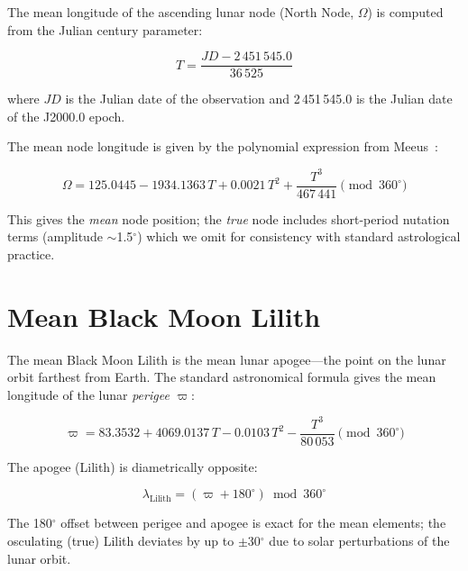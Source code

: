 \documentclass[11pt,letterpaper,twocolumn]{article}
\begin{document}
The mean longitude of the ascending lunar node (North Node, $\Omega$) is computed from the Julian century parameter:

\begin{equation}
T = \frac{JD - 2\,451\,545.0}{36\,525}
\end{equation}

where $JD$ is the Julian date of the observation and 2\,451\,545.0 is the Julian date of the J2000.0 epoch.

The mean node longitude is given by the polynomial expression from Meeus~\cite{meeus}:

\begin{equation}\label{eq:node}
\Omega = 125.0445 - 1934.1363\,T + 0.0021\,T^2 + \frac{T^3}{467\,441} \pmod{360^\circ}
\end{equation}

This gives the \textit{mean} node position; the \textit{true} node includes short-period nutation terms (amplitude $\sim$1.5$^\circ$) which we omit for consistency with standard astrological practice.

\section{Mean Black Moon Lilith}\label{sec:lilith}

The mean Black Moon Lilith is the mean lunar apogee---the point on the lunar orbit farthest from Earth. The standard astronomical formula gives the mean longitude of the lunar \textit{perigee} $\varpi$:

\begin{equation}
\varpi = 83.3532 + 4069.0137\,T - 0.0103\,T^2 - \frac{T^3}{80\,053} \pmod{360^\circ}
\end{equation}

The apogee (Lilith) is diametrically opposite:

\begin{equation}\label{eq:lilith}
\lambda_{\text{Lilith}} = (\varpi + 180^\circ) \bmod 360^\circ
\end{equation}

The 180$^\circ$ offset between perigee and apogee is exact for the mean elements; the osculating (true) Lilith deviates by up to $\pm$30$^\circ$ due to solar perturbations of the lunar orbit.

\end{document}
